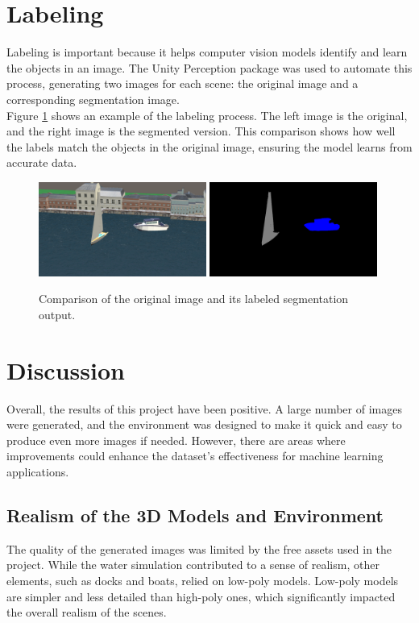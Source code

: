 \section{Labeling}
Labeling is important because it helps computer vision models identify and learn the objects in an image\cite{Labelling}. The Unity Perception package was used to automate this process, generating two images for each scene: the original image and a corresponding segmentation image.\\

\noindent Figure \ref{fig:labeled_images} shows an example of the labeling process. The left image is the original, and the right image is the segmented version. This comparison shows how well the labels match the objects in the original image, ensuring the model learns from accurate data.

\begin{figure}[H]
\centering
\includegraphics[width=0.49\textwidth]{Figures/rgb_2.png}
\includegraphics[width=0.49\textwidth]{Figures/segmentation_2.png}
\caption{Comparison of the original image and its labeled segmentation output.}
\label{fig:labeled_images}
\end{figure}

\section{Discussion}
Overall, the results of this project have been positive. A large number of images were generated, and the environment was designed to make it quick and easy to produce even more images if needed. However, there are areas where improvements could enhance the dataset’s effectiveness for machine learning applications.

\subsection{Realism of the 3D Models and Environment}
The quality of the generated images was limited by the free assets used in the project. While the water simulation contributed to a sense of realism, other elements, such as docks and boats, relied on low-poly models. Low-poly models are simpler and less detailed than high-poly ones, which significantly impacted the overall realism of the scenes. \\

